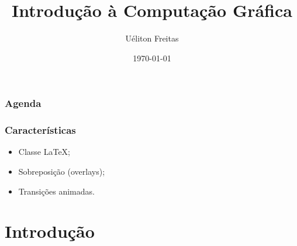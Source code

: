 \documentclass{beamer}
\title[Computação Gráfica]{Introdução à Computação Gráfica} %
\author{Uéliton Freitas} %
\institute[UFMS] %
{
Universidade Católica Don Bosco - UCDB \\ %
\medskip
\textit{freitas.ueliton@gmail.com} %
}
\date{\today} %
\begin{document}
\begin{frame}
\titlepage %
\end{frame}

\begin{frame}
\frametitle{Agenda} %
\tableofcontents %
\end{frame}

\begin{frame}
\frametitle{Características}
\begin{itemize}
\item<1-> Classe \LaTeX;
\item<2-> Sobreposição (overlays);
\item<3-> Transições animadas.
\end{itemize}
\end{frame}



\section{Introdução} 

\end{document}
